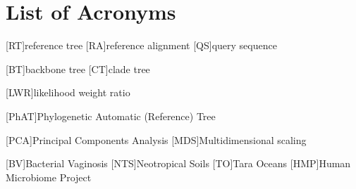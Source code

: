 \documentclass{wissdoc}
\author{\myname}
\title{\mytitle}
\begin{document}
\frontmatter
{}


\blankpage


\blankpage


\blankpage


\blankpage


{\parskip 0pt\tableofcontents}
\blankpage

{\parskip 0pt\listoffigures}
\blankpage

{\parskip 0pt\listoftables}
\blankpage


\chapter*{List of Acronyms}
\begin{acronym}
    [RT]{reference tree}
    [RA]{reference alignment}
    [QS]{query sequence}

    [BT]{backbone tree}
    [CT]{clade tree}

    [LWR]{likelihood weight ratio}

    [PhAT]{Phylogenetic Automatic (Reference) Tree}

    [PCA]{Principal Components Analysis}
    [MDS]{Multidimensional scaling}

    [BV]{Bacterial Vaginosis}
    [NTS]{Neotropical Soils}
    [TO]{Tara Oceans}
    [HMP]{Human Microbiome Project}
\end{acronym}
\blankpage


\mainmatter
{}







\end{document}
